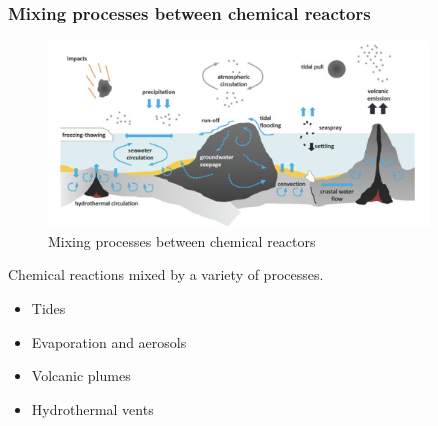 \documentclass[]{article}
\begin{document}
\subsubsection{Mixing processes between chemical reactors}
\begin{figure}[h!]
	\caption{Mixing processes between chemical reactors \cite{stueken2013did}}
	\includegraphics[width=0.9\textwidth]{MixingProcesses}
\end{figure}
Chemical reactions mixed by a variety of processes.

\begin{itemize}
	\item Tides
	\item Evaporation and aerosols
	\item Volcanic plumes
	\item Hydrothermal vents
\end{itemize}
  
  
\end{document}

